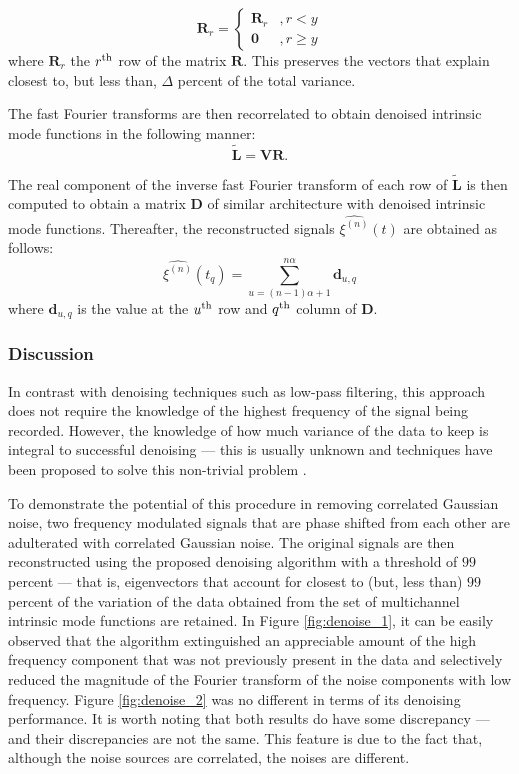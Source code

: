 \documentclass[onecolumn, groupedaddress, 10pt]{revtex4-1}
\begin{document}
\begin{displaymath}
   \mathbf{R}_r = \left\{
     \begin{array}{lr}
        \mathbf{R}_r & , r < y     \\
       \mathbf{0} & , r \geq y
     \end{array}
   \right.
\end{displaymath}
where $\mathbf{R}_r$ the $r^{\textnormal{th}}$ row of the matrix $\mathbf{R}$. This preserves the vectors that explain closest to, but less than, $\Delta$ percent of the total variance.

The fast Fourier transforms are then recorrelated to obtain denoised intrinsic mode functions in the following manner:
\begin{equation}
\tilde{ \mathbf{L} } = \mathbf{V}\mathbf{R}.
\end{equation}

The real component of the inverse fast Fourier transform of each row of $\mathbf{\tilde{L}}$ is then computed to obtain a matrix $\mathbf{D}$ of similar architecture with denoised intrinsic mode functions. Thereafter, the reconstructed signals $\hat{\xi^{(n)}}(t)$ are obtained as follows:
\begin{equation}
\hat{\xi^{(n)}}(t_{q}) = \sum_{u = (n-1)\alpha + 1}^{n\alpha} \mathbf{d}_{u,q}
\end{equation}
where $\mathbf{d}_{u,q}$ is the value at the $u^\textnormal{th}$ row and $q^\textnormal{th}$ column of $\textbf{D}$.

\subsubsection{Discussion}
In contrast with denoising techniques such as low-pass filtering, this approach does not require the knowledge of the highest frequency of the signal being recorded. However, the knowledge of how much variance of the data to keep is integral to successful denoising --- this is usually unknown and techniques have been proposed to solve this non-trivial problem \cite{}.

To demonstrate the potential of this procedure in removing correlated Gaussian noise, two frequency modulated signals that are phase shifted from each other are adulterated with correlated Gaussian noise. The original signals are then reconstructed using the proposed denoising algorithm with a threshold of $99$ percent --- that is, eigenvectors that account for closest to (but, less than) $99$ percent of the variation of the data obtained from the set of multichannel intrinsic mode functions are retained. In Figure \ref{fig:denoise_1}, it can be easily observed that the algorithm extinguished an appreciable amount of the high frequency component that was not previously present in the data and selectively reduced the magnitude of the Fourier transform of the noise components with low frequency. Figure \ref{fig:denoise_2} was no different in terms of its denoising performance. It is worth noting that both results do have some discrepancy --- and their discrepancies are not the same. This feature is due to the fact that, although the noise sources are correlated, the noises are different.
\end{document}
